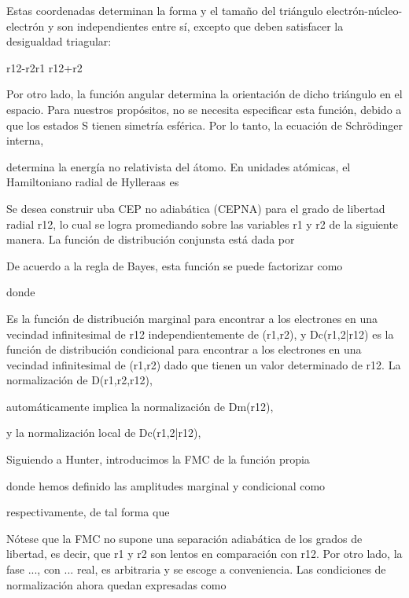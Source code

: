 \documentclass{article}
\begin{document}
Estas coordenadas determinan la forma y el tamaño del triángulo
electrón-núcleo-electrón y son independientes entre sí, excepto 
que deben satisfacer la desigualdad triagular:\newline

\begin{center}
\mid r12-r2\mid \leqslant r1 \leqslant r12+r2 
\end{center} \newline

Por otro lado, la función angular determina la orientación de 
dicho triángulo en el espacio. Para nuestros propósitos, no se 
necesita especificar esta función, debido a que los estados S 
tienen simetría esférica. Por lo tanto, la ecuación de Schrödinger
interna,\newline

determina la energía no relativista del átomo. En unidades 
atómicas, el Hamiltoniano radial de Hylleraas es

Se desea construir uba CEP no adiabática (CEPNA) para el grado de libertad
radial r12, lo cual se logra promediando sobre las variables r1 y r2 de la
siguiente manera. La función de distribución conjunsta está dada por


De acuerdo a la regla de Bayes, esta función se puede factorizar como


donde


Es la función de distribución marginal para encontrar a los electrones en una 
vecindad infinitesimal de r12 independientemente de (r1,r2), y Dc(r1,2|r12)
es la función de distribución condicional para encontrar a los electrones 
en una vecindad infinitesimal de (r1,r2) dado que tienen un valor determinado 
de r12. La normalización de D(r1,r2,r12),


automáticamente implica la normalización de Dm(r12),


y la normalización local de Dc(r1,2|r12),


Siguiendo a Hunter, introducimos la FMC de la función propia


donde hemos definido las amplitudes marginal y condicional como


respectivamente, de tal forma que 


Nótese que la FMC no supone una separación adiabática de los grados de libertad, es decir,
que r1 y r2 son lentos en comparación con r12. Por otro lado, la fase ..., con ... real,
es arbitraria y se escoge a conveniencia.
Las condiciones de normalización ahora quedan expresadas como 
\end{document}

